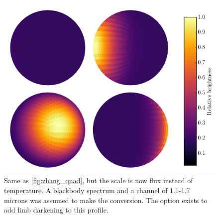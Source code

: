 \documentclass[a4paper,fleqn,usenatbib]{mnras}
\begin{document}
\begin{figure}
\begin{center}
\includegraphics[width=\columnwidth]{img/zhang_quad_bright.pdf}
\caption{Same as \ref{fig:zhang_quad}, but the scale is now flux instead of temperature. A blackbody spectrum and a channel of 1.1-1.7 microns was assumed to make the conversion. The option exists to add limb darkening to this profile.}
\label{fig:zhang_quad2}
\end{center}
\end{figure}
\end{document}
